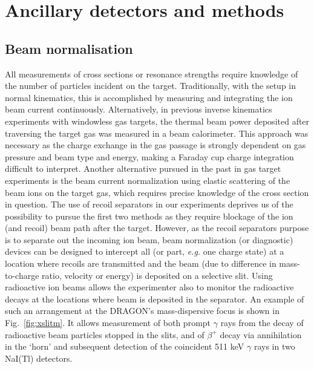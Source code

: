\section{Ancillary detectors and methods}

\subsection{Beam normalisation}

All measurements of cross sections or resonance strengths require knowledge of the number of particles incident on the target. Traditionally, with the setup in normal kinematics, this is accomplished by measuring and integrating the ion beam current continuously. Alternatively, in previous inverse kinematics experiments with windowless gas targets, the thermal beam power deposited after traversing the target gas was measured in a beam calorimeter. This approach was necessary as the charge exchange in the gas passage is strongly dependent on gas pressure and beam type and energy, making a Faraday cup charge integration difficult to interpret. Another alternative pursued in the past in gas target experiments is the beam current normalization using elastic scattering of the beam ions on the target gas, which requires precise knowledge of the cross section in question. The use of recoil separators in our experiments deprives us of the possibility to pursue the first two methods as they require blockage of the ion (and recoil) beam path after the target. However, as the recoil separators purpose is to separate out the incoming ion beam, beam normalization (or diagnostic) devices can be designed to intercept all (or part, {\it e.g.} one charge state) at a location where recoils are transmitted and the beam (due to difference in mass-to-charge ratio, velocity or energy) is deposited on a selective slit. Using radioactive ion beams allows the experimenter also to monitor the radioactive decays at the locations where beam is deposited in the separator. An example of such an arrangement at the DRAGON's mass-dispersive focus is shown in Fig.\ \ref{fig:xslitm}. It allows measurement of both prompt $\gamma$ rays from the decay of radioactive beam particles stopped in the slits, and of $\beta^+$ decay via annihilation in the `horn' and subsequent detection of the coincident 511 keV $\gamma$ rays in two NaI(Tl) detectors. 
%
